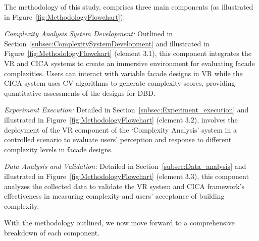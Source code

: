 The methodology of this study, comprises three main components (as illustrated in  Figure~\ref{fig:MethodologyFlowchart}):

\textit{Complexity Analysis System Development:}  Outlined in Section~\ref{subsec:ComplexitySystemDevelopment} and illustrated in Figure~\ref{fig:MethodologyFlowchart} (element 3.1), this component integrates the VR and CICA systems to create an immersive environment for evaluating facade complexities.
Users can interact with variable facade designs in VR while the CICA system uses CV algorithms to generate complexity scores, providing quantitative assessments of the designs for DBD\@.

\textit{Experiment Execution:} Detailed in Section~\ref{subsec:Experiment_execution} and illustrated in Figure~\ref{fig:MethodologyFlowchart} (element 3.2), involves the deployment of the VR component of the `Complexity Analysis' system in a controlled scenario to evaluate users' perception and response to different complexity levels in facade designs.

\textit{Data Analysis and Validation:} Detailed in Section~\ref{subsec:Data_analysis} and illustrated in Figure~\ref{fig:MethodologyFlowchart} (element 3.3), this component analyzes the collected data to validate the VR system and CICA framework's effectiveness in measuring complexity and
users' acceptance of building complexity.

With the methodology outlined, we now move forward to a comprehensive breakdown of each component.


